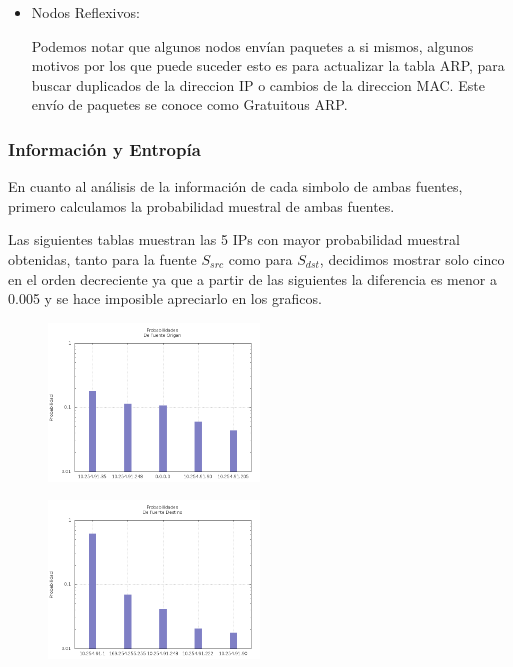 \begin{itemize}
\item Nodos Reflexivos:
\par Podemos notar que algunos nodos envían paquetes a si mismos, algunos motivos por los que puede suceder esto es para actualizar la tabla ARP, para buscar duplicados de la direccion IP o cambios de la direccion MAC. Este envío de paquetes se conoce como Gratuitous ARP\cite{wireshark}\cite{rfc826}.
\end{itemize}

\subsubsection{Informaci\'on y Entrop\'ia}
		        
	\par En cuanto al análisis de la información de cada simbolo de ambas fuentes, primero calculamos la probabilidad muestral de ambas fuentes.
	\par Las siguientes tablas muestran las 5 IPs con mayor probabilidad muestral obtenidas, tanto para la fuente $S_{src}$ como para $S_{dst}$, decidimos mostrar solo cinco en el orden decreciente ya que a partir de las siguientes la diferencia es menor a 0.005 y se hace imposible apreciarlo en los graficos.

\begin{figure}[!ht]
    \centering
    \includegraphics[width=0.5\textwidth]{img/graph/escenario_3/proba_src.png}
\end{figure}


\begin{figure}[!ht]
    \centering
    \includegraphics[width=0.5\textwidth]{img/graph/escenario_3/proba_dst.png}
\end{figure}


